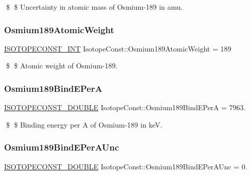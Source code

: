 \$ \$ Uncertainty in atomic mass of Osmium-\/189 in amu. \mbox{\label{group___isotope_const-_osmium-_os189_gab9368781bf89b64751f0ea99820edcc1}} 
\subsubsection{\texorpdfstring{Osmium189\+Atomic\+Weight}{Osmium189AtomicWeight}}
{\footnotesize\ttfamily \mbox{\hyperlink{group___isotope_const-_macros_ga5f18360b3e99483a35c32d789e62621c}{I\+S\+O\+T\+O\+P\+E\+C\+O\+N\+S\+T\+\_\+\+I\+NT}} Isotope\+Const\+::\+Osmium189\+Atomic\+Weight = 189}

\$ \$ Atomic weight of Osmium-\/189. \mbox{\label{group___isotope_const-_osmium-_os189_ga97f1d7e47056adb35fe27a54ad9e539a}} 
\subsubsection{\texorpdfstring{Osmium189\+Bind\+E\+PerA}{Osmium189BindEPerA}}
{\footnotesize\ttfamily \mbox{\hyperlink{group___isotope_const-_macros_ga8f45a7272ce02c0b4c65c44636ed719a}{I\+S\+O\+T\+O\+P\+E\+C\+O\+N\+S\+T\+\_\+\+D\+O\+U\+B\+LE}} Isotope\+Const\+::\+Osmium189\+Bind\+E\+PerA = 7963.}

\$ \$ Binding energy per A of Osmium-\/189 in keV. \mbox{\label{group___isotope_const-_osmium-_os189_gaa5a06e7a8a8cbfe4ba12fd05416542cd}} 
\subsubsection{\texorpdfstring{Osmium189\+Bind\+E\+Per\+A\+Unc}{Osmium189BindEPerAUnc}}
{\footnotesize\ttfamily \mbox{\hyperlink{group___isotope_const-_macros_ga8f45a7272ce02c0b4c65c44636ed719a}{I\+S\+O\+T\+O\+P\+E\+C\+O\+N\+S\+T\+\_\+\+D\+O\+U\+B\+LE}} Isotope\+Const\+::\+Osmium189\+Bind\+E\+Per\+A\+Unc = 0.}

